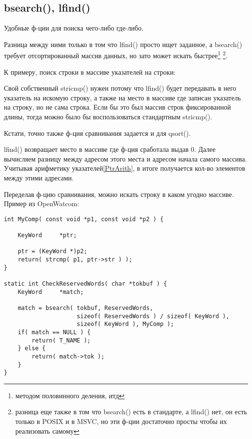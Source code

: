 ﻿\subsection{bsearch(), lfind()}
\label{bsearch_lfind}

Удобные ф-ции для поиска чего-либо где-либо. 

Разница между ними только в том что lfind() просто ищет заданное, а bsearch() требует отсортированный массив
данных, но зато может искать быстрее\footnote{методом половинного деления, итд}
\footnote{разница еще также в том что bsearch() есть в стандарте\cite{C99TC3}, 
а lfind() нет, он есть только в POSIX и в MSVC, но эти ф-ции достаточно просты чтобы их реализовать самому}.

К примеру, поиск строки в массиве указателей на строки:



Свой собственный stricmp() нужен потому что lfind() будет передавать в него указатель на искомую строку,
а также на место в массиве где записан указатель на строку, но не сама строка. Если бы это был
массив строк фиксированной длины, тогда можно было бы воспользоваться стандартным stricmp().

Кстати, точно также ф-ция сравнивания задается и для qsort().

lfind() возвращает место в массиве где ф-ция  сработала выдав 0. Далее вычисляем разницу
между адресом этого места и адресом начала самого массива. Учитывая арифметику указателей\ref{PtrArith}, 
в итоге получается кол-во элементов между этими адресами.

Переделав ф-цию сравнивания, можно искать строку в каком угодно массиве.
Пример из OpenWatcom:

\begin{lstlisting}[caption=\textbackslash{}bld\textbackslash{}pbide\textbackslash{}defgen\textbackslash{}scan.c]
int MyComp( const void *p1, const void *p2 ) {

    KeyWord     *ptr;

    ptr = (KeyWord *)p2;
    return( strcmp( p1, ptr->str ) );
}

static int CheckReservedWords( char *tokbuf ) {
    KeyWord     *match;

    match = bsearch( tokbuf, ReservedWords,
                     sizeof( ReservedWords ) / sizeof( KeyWord ),
                     sizeof( KeyWord ), MyComp );
    if( match == NULL ) {
        return( T_NAME );
    } else {
        return( match->tok );
    }
}
\end{lstlisting}

